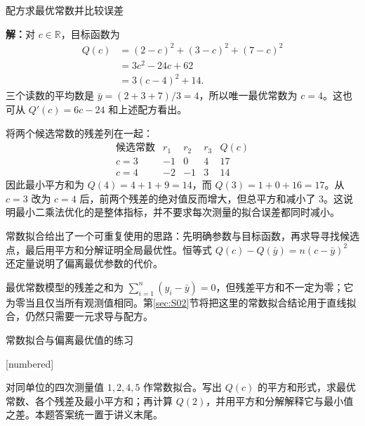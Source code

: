 \documentclass[aspectratio=169,10pt,fontset=fandol]{ctexbeamer}
\makeatletter
\newcommand{\mathagentexerciselabelcontext}[1]{%
\hypertarget<1>{#1}{}%
\edef\@currentHref{#1}%
}
\makeatother
\begin{document}
\begin{frame}[t,fragile]{配方求最优常数并比较误差}
\footnotesize
{\footnotesize
\par\noindent\textbf{解：}对 $c\in\mathbb{R}$，目标函数为
\[
\begin{aligned}
Q(c)&=(2-c)^2+(3-c)^2+(7-c)^2\\
&=3c^2-24c+62\\
&=3(c-4)^2+14.
\end{aligned}
\]
三个读数的平均数是 $\bar{y}=(2+3+7)/3=4$，所以唯一最优常数为 $c=4$。这也可从 $Q'(c)=6c-24$ 和上述配方看出。


}
{\footnotesize
将两个候选常数的残差列在一起：
\[
\begin{array}{c|rrr|r}
\text{候选常数}&r_1&r_2&r_3&Q(c)\\ \hline
c=3&-1&0&4&17\\
c=4&-2&-1&3&14
\end{array}
\]
因此最小平方和为 $Q(4)=4+1+9=14$，而 $Q(3)=1+0+16=17$。从 $c=3$ 改为 $c=4$ 后，前两个残差的绝对值反而增大，但总平方和减小了 $3$。这说明最小二乘法优化的是整体指标，并不要求每次测量的拟合误差都同时减小。\par

}
{\footnotesize
常数拟合给出了一个可重复使用的思路：先明确参数与目标函数，再求导寻找候选点，最后用平方和分解证明全局最优性。恒等式 $Q(c)-Q(\bar{y})=n(c-\bar{y})^2$ 还定量说明了偏离最优参数的代价。


}
{\footnotesize
最优常数模型的残差之和为 $\sum_{i=1}^{n}(y_i-\bar{y})=0$，但残差平方和不一定为零；它为零当且仅当所有观测值相同。第\ref{sec:S02}节将把这里的常数拟合结论用于直线拟合，仍然只需要一元求导与配方。\par

}
\end{frame}
\begin{frame}[t,fragile]{常数拟合与偏离最优值的练习}
\normalsize
{\normalsize
[numbered]
\mathagentexerciselabelcontext{mathagent.exercise.U0014.0}
\begin{exercise}
\label{mathagent:exercise:79e91357ee05b8b9aa4c657d553157f1ef411624d282c3f2337dd0e01453ce2d}
对同单位的四次测量值 $1,2,4,5$ 作常数拟合。写出 $Q(c)$ 的平方和形式，求最优常数、各个残差及最小平方和；再计算 $Q(2)$，并用平方和分解解释它与最小值之差。本题答案统一置于讲义末尾。
\end{exercise}
}
\end{frame}
\end{document}

